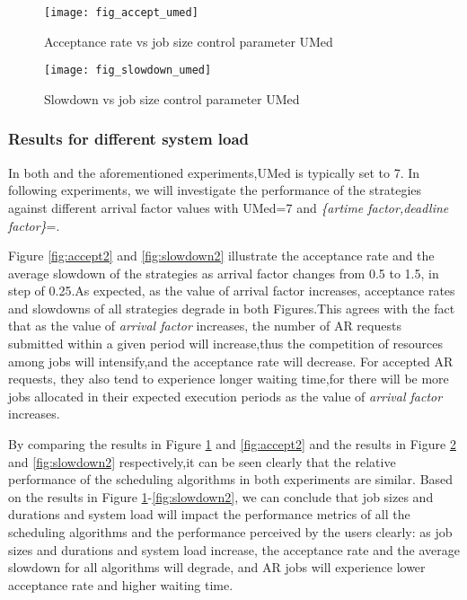 \documentclass[preprint,12pt]{elsarticle}
\begin{document}
\begin{figure}[htp]
\centering
\texttt{[image: fig\_accept\_umed]}
\caption{Acceptance rate vs job size control parameter UMed}
\label{fig:fig41}
\end{figure}



\begin{figure}[htp]
\centering
\texttt{[image: fig\_slowdown\_umed]}
\caption{Slowdown vs job size control parameter UMed}
\label{fig:fig42}
\end{figure}



\subsubsection{Results for different system load}
In both \cite{lublin2003workload} and the aforementioned experiments,UMed is typically set to 7.
In following experiments, we will investigate the performance of the strategies against different arrival factor values with UMed=7 and  \emph{\{artime factor,deadline factor\}}=.

Figure \ref{fig:accept2} and \ref{fig:slowdown2} illustrate the acceptance rate and the average slowdown of the strategies as arrival factor changes from 0.5 to 1.5, in step of 0.25.As expected, as the value of arrival factor increases, acceptance rates and slowdowns of all strategies degrade in both Figures.This agrees with the fact that as the value of \emph{arrival factor} increases, the number of AR requests submitted within a given period will increase,thus the competition of resources among jobs will intensify,and the acceptance rate will decrease. For accepted AR requests, they also tend to experience longer waiting time,for there will be more jobs allocated in their expected execution periods as the value of \emph{arrival factor} increases.

By comparing the results in Figure \ref{fig:fig41} and \ref{fig:accept2} and the results in Figure \ref{fig:fig42} and \ref{fig:slowdown2} respectively,it can be seen clearly that the relative performance of the scheduling algorithms in both experiments are similar. Based on the results in Figure \ref{fig:fig41}-\ref{fig:slowdown2}, we can conclude that job sizes and durations and system load will impact the performance metrics of all the scheduling algorithms and the performance perceived by the users clearly: as job sizes and durations and system load increase, the acceptance rate and the average slowdown for all algorithms will degrade, and AR jobs will experience lower acceptance rate and higher waiting time.
\end{document}
